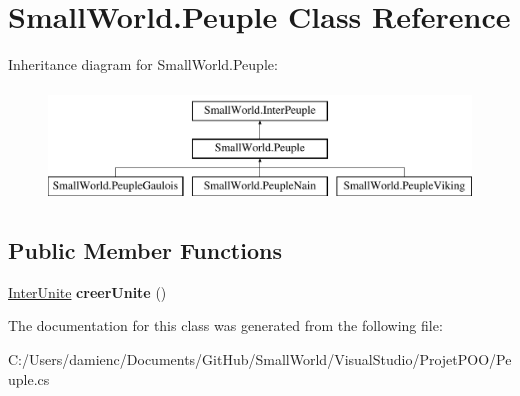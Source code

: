 \hypertarget{class_small_world_1_1_peuple}{\section{Small\-World.\-Peuple Class Reference}
\label{class_small_world_1_1_peuple}
}
Inheritance diagram for Small\-World.\-Peuple\-:\begin{figure}[H]
\begin{center}
\leavevmode
\includegraphics[height=3.000000cm]{class_small_world_1_1_peuple}
\end{center}
\end{figure}
\subsection*{Public Member Functions}
\begin{DoxyCompactItemize}
\item 
\hypertarget{class_small_world_1_1_peuple_ae780348f6362ec2b371f58f0a2f696a1}{\hyperlink{interface_small_world_1_1_inter_unite}{Inter\-Unite} {\bfseries creer\-Unite} ()}\label{class_small_world_1_1_peuple_ae780348f6362ec2b371f58f0a2f696a1}

\end{DoxyCompactItemize}


The documentation for this class was generated from the following file\-:\begin{DoxyCompactItemize}
\item 
C\-:/\-Users/damienc/\-Documents/\-Git\-Hub/\-Small\-World/\-Visual\-Studio/\-Projet\-P\-O\-O/Peuple.\-cs\end{DoxyCompactItemize}
